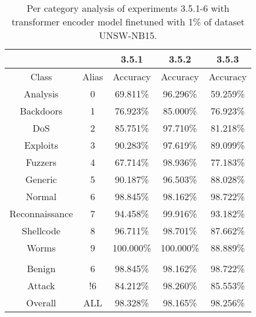 \begin{table}[htb]
    \centering
    \begin{tabular}{@{}ccccc@{}}
        \toprule
         &  & 3.5.1 & 3.5.2 & 3.5.3 \\
        \midrule
        Class &  Alias &  Accuracy &  Accuracy &  Accuracy \\
        Analysis &  0 &  69.811\% &  96.296\% &  59.259\% \\
        Backdoors &  1 &  76.923\% &  85.000\% &  76.923\% \\
        DoS &  2 &  85.751\% &  97.710\% &  81.218\% \\
        Exploits &  3 &  90.283\% &  97.619\% &  89.099\% \\
        Fuzzers &  4 &  67.714\% &  98.936\% &  77.183\% \\
        Generic &  5 &  90.187\% &  96.503\% &  88.028\% \\
        Normal &  6 &  98.845\% &  98.162\% &  98.722\% \\
        Reconnaissance &  7 &  94.458\% &  99.916\% &  93.182\% \\
        Shellcode &  8 &  96.711\% &  98.701\% &  87.662\% \\
        Worms &  9 &  100.000\% &  100.000\% &  88.889\% \\
         \\
        Benign &  6 &  98.845\% &  98.162\% &  98.722\% \\
        Attack &  !6 &  84.212\% &  98.260\% &  85.553\% \\
        Overall &  ALL &  98.328\% &  98.165\% &  98.256\% \\
        \bottomrule
    \end{tabular}
    \caption{Per category analysis of experiments 3.5.1-6 with transformer encoder model finetuned with 1\% of dataset UNSW-NB15.}
    \label{table:results:lstm:class_flows15_10}
\end{table}